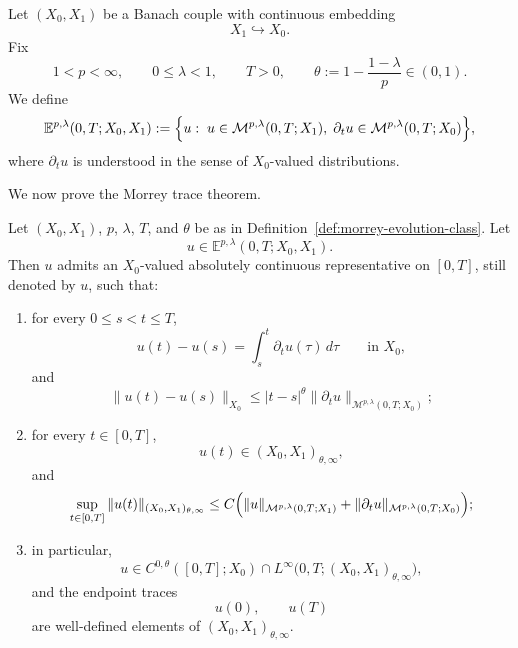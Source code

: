 \documentclass[smallextended,envcountsect,envcountsame]{svjour3}
\begin{document}
	\begin{definition}\label{def:morrey-evolution-class}
		Let $(X_0,X_1)$ be a Banach couple with continuous embedding
		\[
		X_1\hookrightarrow X_0.
		\]
		Fix
		\[
		1<p<\infty,\qquad 0\le \lambda<1,\qquad T>0,
		\qquad
		\theta:=1-\frac{1-\lambda}{p}\in(0,1).
		\]
		We define
		\[
		\mathbb E^{p,\lambda}(0,T;X_0,X_1)
		:=
		\Bigl\{
		u:\;
		u\in \mathcal M^{p,\lambda}(0,T;X_1),\;
		\partial_t u\in \mathcal M^{p,\lambda}(0,T;X_0)
		\Bigr\},
		\]
		where $\partial_t u$ is understood in the sense of $X_0$-valued distributions.
	\end{definition}
	
	We now prove the Morrey trace theorem.

\begin{theorem}\label{thm:morrey-trace-evolution}
		Let $(X_0,X_1)$, $p$, $\lambda$, $T$, and $\theta$ be as in Definition~\ref{def:morrey-evolution-class}. Let
		\[
		u\in \mathbb E^{p,\lambda}(0,T;X_0,X_1).
		\]
		Then $u$ admits an $X_0$-valued absolutely continuous representative on $[0,T]$, still denoted by $u$, such that:
		
		\begin{enumerate}[label=\textup{(\roman*)}]
			\item for every $0\le s<t\le T$,
			\[
			u(t)-u(s)=\int_s^t \partial_t u(\tau)\,d\tau
			\qquad\text{in }X_0,
			\]
			and
			\[
			\|u(t)-u(s)\|_{X_0}
			\le
			|t-s|^\theta
			\|\partial_t u\|_{\mathcal M^{p,\lambda}(0,T;X_0)};
			\]
			
			\item for every $t\in[0,T]$,
			\[
			u(t)\in (X_0,X_1)_{\theta,\infty},
			\]
			and
			\[
			\sup_{t\in[0,T]}
			\|u(t)\|_{(X_0,X_1)_{\theta,\infty}}
			\le
			C\Bigl(
			\|u\|_{\mathcal M^{p,\lambda}(0,T;X_1)}
			+
			\|\partial_t u\|_{\mathcal M^{p,\lambda}(0,T;X_0)}
			\Bigr);
			\]
			
			\item in particular,
			\[
			u\in C^{0,\theta}([0,T];X_0)\cap L^\infty\bigl(0,T;(X_0,X_1)_{\theta,\infty}\bigr),
			\]
			and the endpoint traces
			\[
			u(0),\qquad u(T)
			\]
			are well-defined elements of $(X_0,X_1)_{\theta,\infty}$.
		\end{enumerate}
	\end{theorem}
	
\end{document}
